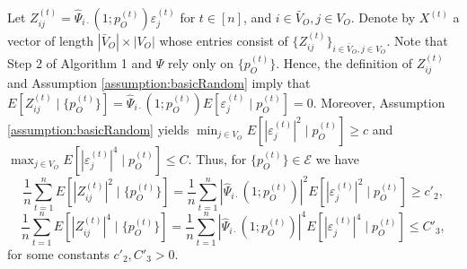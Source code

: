 \documentclass[opre,nonblindrev]{informs3} %
\begin{document}
\begin{APPENDIX}{}
Let $Z^{(t)}_{ij}=
\hat \Psi_{i\cdot} (1;p_O^{(t)} ) \varepsilon_j^{(t)}$ for $t\in[n]$, and $i\in \bar{V}_O, j\in V_O$.
Denote by
$X^{(t)}$  a  vector of length $|\bar V_O| \times |{V}_O|$ whose entries consist of
$\{Z^{(t)}_{ij}\}_{ i\in \bar{V}_O,j \in {V}_O }$.
Note that Step 2 of Algorithm 1
and $\hat \Psi$ 
rely only on $\{p_O^{(t)}\}$. 
Hence, the definition of $Z_{ij}^{(t)}$ 
and Assumption \ref{assumption:basicRandom}
imply that 
$E[Z^{(t)}_{ij} \mid  \{p_O^{(t)} \}]=
\hat \Psi_{i\cdot} (1;p_O^{(t)} )
E[\varepsilon_j^{(t)}\mid p_O^{(t)}]
=0$.
Moreover, Assumption \ref{assumption:basicRandom} yields 
$\min_{j\in V_O}E[|\varepsilon_j^{(t)}|^2 \mid p_O^{(t)}] \geq c$ and  $\max_{j\in V_O}E[|\varepsilon_j^{(t)}|^4 \mid p_O^{(t)}] \leq C$. 
Thus, for $\{p_O^{(t)}\} \in \mathcal{E}$
we have
$$\frac{1}{n}\sum_{t=1}^nE[|Z^{(t)}_{ij}|^2  \mid  \{p_O^{(t)} \} ] = \frac{1}{n}\sum_{t=1}^n |\hat \Psi_{i\cdot} (1;p_O^{(t)} )|^2E[|\varepsilon^{(t)}_{j}|^2\mid p_O^{(t)}] \geq c'_2,  $$
$$\frac{1}{n}\sum_{t=1}^nE[|Z^{(t)}_{ij}|^4  \mid  \{p_O^{(t)} \} ] = \frac{1}{n}\sum_{t=1}^n |\hat \Psi_{i\cdot} (1;p_O^{(t)} )|^4E[|\varepsilon^{(t)}_{j}|^4\mid p_O^{(t)}] \leq C'_3 , $$
for some constants $c'_2,C'_3>0$.


\end{APPENDIX}
\end{document}
